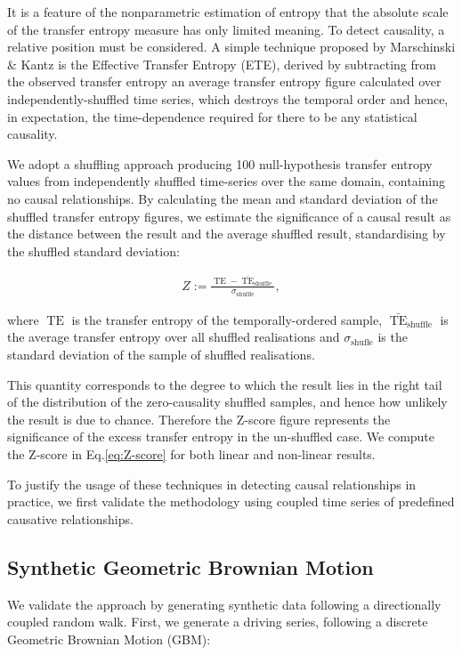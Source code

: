 \documentclass[]{rsos}%
\begin{document}
  
  It is a feature of the nonparametric estimation of entropy that the absolute scale of the transfer entropy measure has only limited meaning. To detect causality, a relative position must be considered. A simple technique proposed by Marschinski \& Kantz \cite{Marschinski2002} is the Effective Transfer Entropy (ETE), derived by subtracting from the observed transfer entropy an average transfer entropy figure calculated over independently-shuffled time series, which destroys the temporal order and hence{\color{blue}, in expectation, the time-dependence required for there to be any statistical causality}.

  We adopt a shuffling approach producing 100 null-hypothesis transfer entropy values from independently shuffled time-series over the same domain, containing no {\color{blue} causal relationships}. By calculating the mean and standard deviation of the shuffled transfer entropy figures, we estimate the significance of a causal result as the distance between the result and the average shuffled result, standardising by the shuffled standard deviation:
  
  \begin{eqnarray}
    \label{eq:Z-score}
    Z := \frac{\operatorname{TE} - \bar{\operatorname{TE}}_{\operatorname{shuffle}}}
              {\sigma_{\operatorname{shuffle}}} ,
  \end{eqnarray}
  
  where $\operatorname{TE}$ is the transfer entropy of the temporally-ordered sample, $\bar{\operatorname{TE}}_{\operatorname{shuffle}}$ is the average transfer entropy over all shuffled realisations and $\sigma_{\operatorname{shufle}} $ is the standard deviation of the sample of shuffled realisations.
  
  This quantity corresponds to the degree to which the result lies in the right tail of the distribution of the zero-causality shuffled samples, and hence how unlikely the result is due to chance. Therefore the Z-score figure represents the significance of the excess transfer entropy in the un-shuffled case. We compute the Z-score in Eq.\ref{eq:Z-score} for both linear and non-linear results.


  To justify the usage of these techniques in detecting causal relationships in practice, we first validate the methodology using coupled time series of predefined causative relationships. 


  \subsection{Synthetic Geometric Brownian Motion}\label{s.LinearSignal}
  We validate the approach by generating synthetic data following a directionally coupled random walk. First, we generate a driving series, following a discrete Geometric Brownian Motion (GBM):
\end{document}
